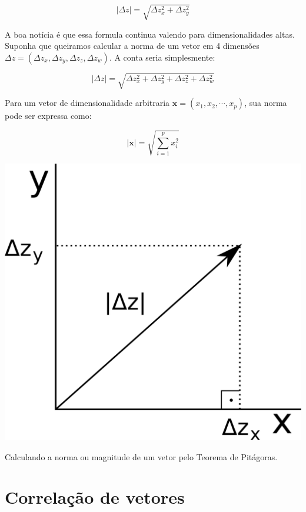 \documentclass[portuges,]{tufte-handout}
\begin{document}
\[
|\Delta z| = \sqrt{\Delta z_x^2 + \Delta z_y^2}
\]

A boa notícia é que essa formula continua valendo para dimensionalidades
altas. Suponha que queiramos calcular a norma de um vetor em 4 dimensões
\(\Delta z = (\Delta z_x, \Delta z_y, \Delta z_z, \Delta z_w)\). A conta
seria simplesmente:

\[
|\Delta z| = \sqrt{\Delta z_x^2 + \Delta z_y^2+ \Delta z_z^2 + \Delta z_w^2}
\]

Para um vetor de dimensionalidade arbitraria
\(\mathbf{x} = (x_1, x_2, \cdots, x_p)\), sua norma pode ser expressa
como:

\[
|\mathbf{x}| = \sqrt{\sum_{i=1}^p x_i^2}
\]

\begin{marginfigure}
\includegraphics{./figuras/pitagoras.png}
\caption{Calculando a norma ou magnitude de um vetor pelo
Teorema de Pitágoras.}
\label{pitagoras}
\end{marginfigure}

\section{Correlação de vetores}\label{correlauxe7uxe3o-de-vetores}
\end{document}
